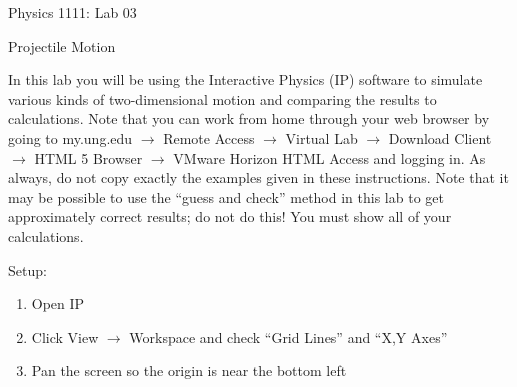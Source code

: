 \documentclass[12pt]{article}
\begin{document}
{\centering
\large Physics 1111: Lab 03 \par
\large Projectile Motion \par
}
\hfill \break \vspace{-4mm}

In this lab you will be using the Interactive Physics (IP) software to simulate various kinds of two-dimensional motion and comparing the results to calculations.
Note that you can work from home through your web browser by going to my.ung.edu $\rightarrow$ Remote Access $\rightarrow$ Virtual Lab $\rightarrow$ Download Client $\rightarrow$ HTML 5 Browser $\rightarrow$ VMware Horizon HTML Access and logging in.
As always, do not copy exactly the examples given in these instructions.
Note that it may be possible to use the “guess and check” method in this lab to get approximately correct results; do not do this!
You must show all of your calculations.

Setup:
\begin{enumerate}
\item Open IP
\item Click View $\rightarrow$ Workspace and check ``Grid Lines'' and ``X,Y Axes''
\item Pan the screen so the origin is near the bottom left
\end{enumerate}
\end{document}

